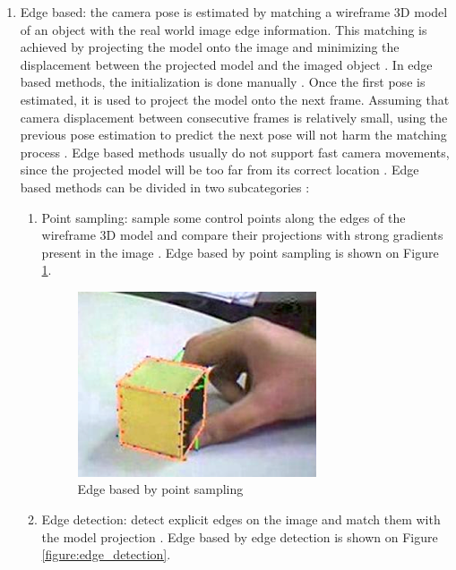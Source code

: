 \begin{enumerate}
  \item Edge based: the camera pose is estimated by matching a wireframe 3D model of an object with the real world image edge information. This matching is achieved by projecting the model onto the image and minimizing the displacement between the projected model and the imaged object \cite{Teichrieb2007,Lepetit2005}. In edge based methods, the initialization is done manually \cite{Teichrieb2007}. Once the first pose is estimated, it is used to project the model onto the next frame. Assuming that camera displacement between consecutive frames is relatively small, using the previous pose estimation to predict the next pose will not harm the matching process \cite{Teichrieb2007}. Edge based methods usually do not support fast camera movements, since the projected model will be too far from its correct location \cite{Teichrieb2007}. Edge based methods can be divided in two subcategories \cite{Teichrieb2007}:

    \begin{enumerate}
      \item Point sampling: sample some control points along the edges of the wireframe 3D model and compare their projections with strong gradients present in the image \cite{Teichrieb2007}. Edge based by point sampling is shown on Figure \ref{figure:point_sampling}.

      \begin{figure}[!htb]
        \centering
        \includegraphics[width=200pt]{chapters/basic_concepts/point_sampling.png}
        \caption{Edge based by point sampling}
        \label{figure:point_sampling}
      \end{figure}

      \item Edge detection: detect explicit edges on the image and match them with the model projection \cite{Teichrieb2007}. Edge based by edge detection is shown on Figure \ref{figure:edge_detection}.


\end{enumerate}
\end{enumerate}
